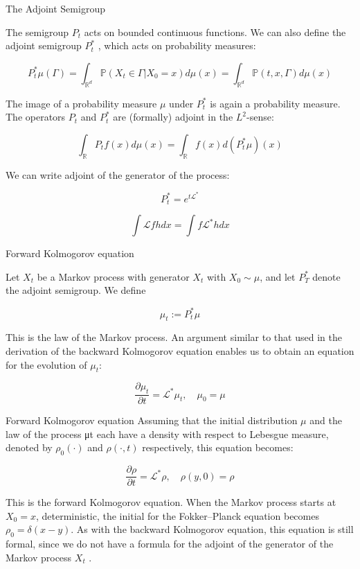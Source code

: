 \documentclass{beamer}%
\theoremstyle{definition}
\newcommand{\R}{\mathbb{R}}
\renewcommand{\P}{\mathbb{P}}
\begin{document}
\begin{frame}{The Adjoint Semigroup}

The semigroup $P_t$ acts on bounded continuous functions. We can also define the
adjoint semigroup $P^{*}_{t}$
, which acts on probability measures:

\[P^{*}_{t} \mu (\Gamma) = \int_{\R^d} \P(X_t \in \Gamma| X_0 = x) d \mu(x) = \int_{\R^d} \P(t, x, \Gamma) d \mu(x)\]

The image of a probability measure $\mu$ under $P^*_t$
is again a probability measure. The
operators $P_t$ and $P^*_t$
are (formally) adjoint in the $L^2$-sense:

\[\int_{\R} P_t f(x) d\mu(x) = \int_{\R}  f(x) d(P^*_t\mu)(x)\]

We can write adjoint of the generator of the process:

\[P^*_t = e^{t\mathscr{L}^*}\]

\[\int \mathscr{L}f h dx =  \int f\mathscr{L}^*hdx \]
  
\end{frame}

\begin{frame}{Forward Kolmogorov equation}

Let $X_t$ be a Markov process with generator $X_t$ with $X_0 \sim \mu$, and let $P^*_T$ denote the
adjoint semigroup. We define

\[\mu_t := P^*_t \mu\]

This is the law of the Markov process. An argument similar to that used in the
derivation of the backward Kolmogorov equation enables us to obtain an
equation for the evolution of $\mu_t$:

\[\frac{\partial \mu_t}{\partial t} = \mathscr{L}^* \mu_t, \quad \mu_0 = \mu\]
    
\end{frame}

\begin{frame}{Forward Kolmogorov equation}
Assuming that the initial distribution $\mu$ and the law of the process μt each have a
density with respect to Lebesgue measure, denoted by $\rho_0(\cdot)$ and $\rho(\cdot, t)$ respectively,
this equation becomes:

\[\frac{\partial \rho}{\partial t} = \mathscr{L}^* \rho, \quad \rho(y, 0) = \rho\]

This is the forward Kolmogorov equation. When the Markov process starts at $X_0 =
x$, deterministic, the initial for the Fokker–Planck equation becomes $\rho_0 = \delta(x - y)$.
As with the backward Kolmogorov equation, this equation is still formal,
since we do not have a formula for the adjoint of the generator of the Markov
process $X_t$ .

\end{frame}
\end{document}
